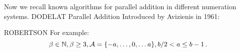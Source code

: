 Now we recall known algorithms for parallel addition in different numeration systems. 
DODELAT 
    {Parallel Addition}
    Introduced by Avizienis in 1961:
  
  ROBERTSON
  For example:
  $$
  \beta \in \mathbb{N}, \beta \geq 3, \mathcal{A}=\{-a, \dots, 0, \dots a\}, b/2 <a \leq b-1\,. 
  $$  
  